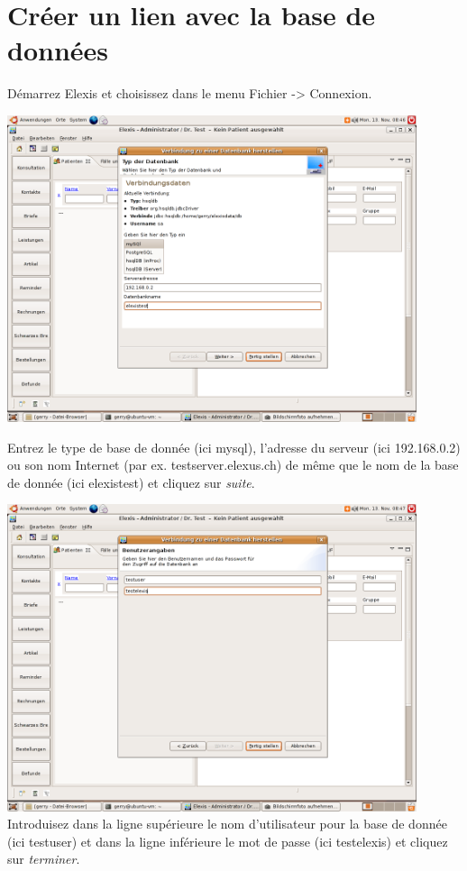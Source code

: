 \section{Créer un lien avec la base de données}
\label{connect}
Démarrez Elexis et choisissez dans le menu  Fichier -> Connexion.

\includegraphics[width=0.9\textwidth]{images/verbindung11.png}



Entrez le type de base de donnée (ici mysql), l'adresse du serveur (ici 192.168.0.2) ou son nom Internet (par ex. testserver.elexus.ch) de même que le nom de la base de donnée (ici elexistest) et cliquez sur
\textit{suite}.

\includegraphics[width=0.9\textwidth]{images/verbindung12.png}
Introduisez dans la ligne supérieure le nom d'utilisateur pour la base de donnée (ici testuser) et dans la ligne inférieure le mot de passe (ici testelexis) et cliquez sur \textit{terminer}.

